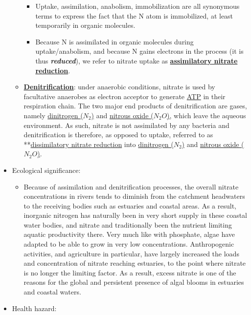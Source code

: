 \documentclass[]{book}
\providecommand{\tightlist}{%
  \setlength{\itemsep}{0pt}\setlength{\parskip}{0pt}}
\theoremstyle{definition}
\theoremstyle{definition}
\theoremstyle{definition}
\theoremstyle{remark}
\begin{document}
\begin{itemize}
\begin{itemize}
    \begin{itemize}
    \tightlist
    \item
      Uptake, assimilation, anabolism, immobilization are all synonymous
      terms to express the fact that the N atom is immobilized, at least
      temporarily in organic molecules.
    \item
      Because N is assimilated in organic molecules during
      uptake/anabolism, and because N gains electrons in the process (it
      is thus \textbf{\emph{reduced}}), we refer to nitrate uptake as
      \textbf{\protect\hyperlink{ANR}{assimilatory nitrate reduction}}.
    \end{itemize}
  \item
    \textbf{\protect\hyperlink{denitrification}{Denitrification}}: under
    anaerobic conditions, nitrate is used by facultative anaerobes as
    electron acceptor to generate \protect\hyperlink{ATP}{ATP} in their
    respiration chain. The two major end products of denitrification are
    gases, namely \protect\hyperlink{N2}{dinitrogen (\(N_2\))} and
    \protect\hyperlink{N2O}{nitrous oxide (\(N_2O\))}, which leave the
    aqueous environment. As such, nitrate is not assimilated by any
    bacteria and denitrification is therefore, as opposed to uptake,
    referred to as **\protect\hyperlink{DNR}{dissimilatory nitrate
    reduction} into \protect\hyperlink{N2}{dinitrogen (\(N_2\))} and
    \protect\hyperlink{N2O}{nitrous oxide (\(N_2O\))}.
  \end{itemize}
\item
  Ecological significance:

  \begin{itemize}
  \tightlist
  \item
    Because of assimilation and denitrification processes, the overall
    nitrate concentrations in rivers tends to diminish from the
    catchment headwaters to the receiving bodies such as estuaries and
    coastal areas. As a result, inorganic nitrogen has naturally been in
    very short supply in these coastal water bodies, and nitrate and
    traditionally been the nutrient limiting aquatic productivity there.
    Very much like with phosphate, algae have adapted to be able to grow
    in very low concentrations. Anthropogenic activities, and
    agriculture in particular, have largely increased the loads and
    concentration of nitrate reaching estuaries, to the point where
    nitrate is no longer the limiting factor. As a result, excess
    nitrate is one of the reasons for the global and persistent presence
    of algal blooms in estuaries and coastal waters.
  \end{itemize}
\item
  Health hazard:


\end{itemize}
\end{document}
